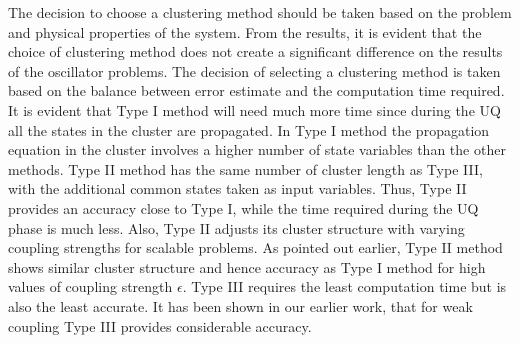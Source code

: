 The decision to choose a clustering method should be taken based on the problem and physical properties of the system. From the results, it is evident that the choice of clustering method does not create a significant difference on the results of the oscillator problems. The decision of selecting a clustering method is taken based on the balance between error estimate and the computation time required. It is evident that Type I method will need much more time since during the UQ all the states in the cluster are propagated. In Type I method the propagation equation in the cluster involves a higher number of state variables than the other methods. Type II method has the same number of cluster length as Type III, with the additional common states taken as input variables. Thus, Type II provides an accuracy close to Type I, while the time required during the UQ phase is much less. Also, Type II adjusts its cluster structure with varying coupling strengths for scalable problems. As pointed out earlier, Type II method shows similar cluster structure and hence accuracy as Type I method for high values of coupling strength $\epsilon$. Type III requires the least computation time but is also the least accurate. It has been shown in our earlier work, that for weak coupling Type III provides considerable accuracy. 

